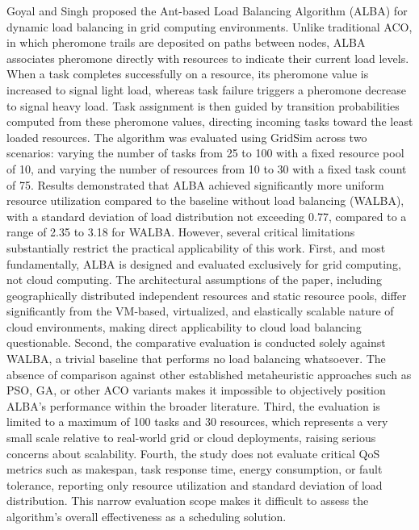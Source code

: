 \documentclass[pdflatex,sn-mathphys-num]{sn-jnl}%
\theoremstyle{thmstyleone}%
\theoremstyle{thmstyletwo}%
\theoremstyle{thmstylethree}%
\begin{document}
Goyal and Singh \cite{bib10} proposed the Ant-based Load Balancing Algorithm (ALBA) for dynamic load balancing in grid computing environments. Unlike traditional ACO, in which pheromone trails are deposited on paths between nodes, ALBA associates pheromone directly with resources to indicate their current load levels. When a task completes successfully on a resource, its pheromone value is increased to signal light load, whereas task failure triggers a pheromone decrease to signal heavy load. Task assignment is then guided by transition probabilities computed from these pheromone values, directing incoming tasks toward the least loaded resources. The algorithm was evaluated using GridSim across two scenarios: varying the number of tasks from 25 to 100 with a fixed resource pool of 10, and varying the number of resources from 10 to 30 with a fixed task count of 75. Results demonstrated that ALBA achieved significantly more uniform resource utilization compared to the baseline without load balancing (WALBA), with a standard deviation of load distribution not exceeding 0.77, compared to a range of 2.35 to 3.18 for WALBA.
However, several critical limitations substantially restrict the practical applicability of this work. First, and most fundamentally, ALBA is designed and evaluated exclusively for grid computing, not cloud computing. The architectural assumptions of the paper, including geographically distributed independent resources and static resource pools, differ significantly from the VM-based, virtualized, and elastically scalable nature of cloud environments, making direct applicability to cloud load balancing questionable. Second, the comparative evaluation is conducted solely against WALBA, a trivial baseline that performs no load balancing whatsoever. The absence of comparison against other established metaheuristic approaches such as PSO, GA, or other ACO variants makes it impossible to objectively position ALBA's performance within the broader literature. Third, the evaluation is limited to a maximum of 100 tasks and 30 resources, which represents a very small scale relative to real-world grid or cloud deployments, raising serious concerns about scalability. Fourth, the study does not evaluate critical QoS metrics such as makespan, task response time, energy consumption, or fault tolerance, reporting only resource utilization and standard deviation of load distribution. This narrow evaluation scope makes it difficult to assess the algorithm's overall effectiveness as a scheduling solution.
\end{document}
